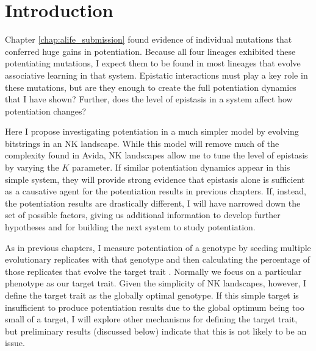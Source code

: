 \section{Introduction}

Chapter \ref{chap:alife_submission} found evidence of individual mutations that conferred huge gains in potentiation. %
Because all four lineages exhibited these potentiating mutations, I expect them to be found in most lineages that evolve associative learning in that system. 
Epistatic interactions must play a key role in these mutations, but are they enough to create the full potentiation dynamics that I have shown? %
Further, does the level of epistasis in a system affect how potentiation changes?

Here I propose investigating potentiation in a much simpler model by evolving bitstrings in an NK landscape. 
While this model will remove much of the complexity found in Avida, NK landscapes allow me to tune the level of epistasis by varying the $K$ parameter. 
If similar potentiation dynamics appear in this simple system, they will provide strong evidence that epistasis alone is sufficient as a causative agent for the potentiation results in previous chapters.
If, instead, the potentiation results are drastically different, I will have narrowed down the set of possible factors, giving us additional information to develop further hypotheses and for building the next system to study potentiation. %

As in previous chapters, I measure potentiation of a genotype by seeding multiple evolutionary replicates with that genotype and then calculating the percentage of those replicates that evolve the target trait \citep{blountGenomicAnalysisKey2012}.
Normally we focus on a particular phenotype as our target trait.  Given the simplicity of NK landscapes, however, I define the target trait as the globally optimal genotype.
If this simple target is insufficient to produce potentiation results due to the global optimum being too small of a target, I will explore other mechanisms for defining the target trait, but preliminary results (discussed below) indicate that this is not likely to be an issue.

